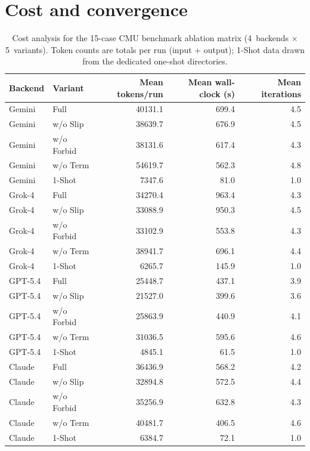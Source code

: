 \documentclass[%
 preprint,
 superscriptaddress,
 amsmath,amssymb,
 aps,
 prb,
 floatfix,
]{revtex4-2}
\begin{document}
\clearpage

\section{Cost and convergence}

\begin{table}[ht]
\centering
\caption{Cost analysis for the 15-case CMU benchmark ablation matrix (4~backends $\times$ 5~variants). Token counts are totals per run (input + output); 1-Shot data drawn from the dedicated one-shot directories.}
\label{tab:si6-cost-analysis}
\begin{tabular}{llrrr}
\toprule
Backend & Variant & Mean tokens/run & Mean wall-clock (s) & Mean iterations \\
\midrule
Gemini & Full & 40131.1 & 699.4 & 4.5 \\
Gemini & w/o Slip & 38639.7 & 676.9 & 4.5 \\
Gemini & w/o Forbid & 38131.6 & 617.4 & 4.3 \\
Gemini & w/o Term & 54619.7 & 562.3 & 4.8 \\
Gemini & 1-Shot & 7347.6 & 81.0 & 1.0 \\
Grok-4 & Full & 34270.4 & 963.4 & 4.3 \\
Grok-4 & w/o Slip & 33088.9 & 950.3 & 4.5 \\
Grok-4 & w/o Forbid & 33102.9 & 553.8 & 4.3 \\
Grok-4 & w/o Term & 38941.7 & 696.1 & 4.4 \\
Grok-4 & 1-Shot & 6265.7 & 145.9 & 1.0 \\
GPT-5.4 & Full & 25448.7 & 437.1 & 3.9 \\
GPT-5.4 & w/o Slip & 21527.0 & 399.6 & 3.6 \\
GPT-5.4 & w/o Forbid & 25863.9 & 440.9 & 4.1 \\
GPT-5.4 & w/o Term & 31036.5 & 595.6 & 4.6 \\
GPT-5.4 & 1-Shot & 4845.1 & 61.5 & 1.0 \\
Claude & Full & 36436.9 & 568.2 & 4.2 \\
Claude & w/o Slip & 32894.8 & 572.5 & 4.4 \\
Claude & w/o Forbid & 35256.9 & 632.8 & 4.3 \\
Claude & w/o Term & 40481.7 & 406.5 & 4.6 \\
Claude & 1-Shot & 6384.7 & 72.1 & 1.0 \\
\bottomrule
\end{tabular}
\end{table}
\end{document}
